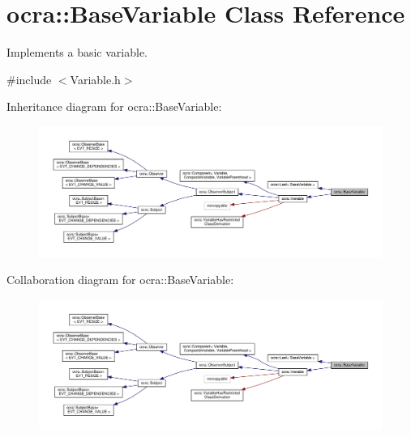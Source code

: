 \hypertarget{classocra_1_1BaseVariable}{}\section{ocra\+:\+:Base\+Variable Class Reference}
\label{classocra_1_1BaseVariable}


Implements a basic variable.  




{\ttfamily \#include $<$Variable.\+h$>$}



Inheritance diagram for ocra\+:\+:Base\+Variable\+:
\nopagebreak
\begin{figure}[H]
\begin{center}
\leavevmode
\includegraphics[width=350pt]{db/ddd/classocra_1_1BaseVariable__inherit__graph}
\end{center}
\end{figure}


Collaboration diagram for ocra\+:\+:Base\+Variable\+:
\nopagebreak
\begin{figure}[H]
\begin{center}
\leavevmode
\includegraphics[width=350pt]{d1/d35/classocra_1_1BaseVariable__coll__graph}
\end{center}
\end{figure}
